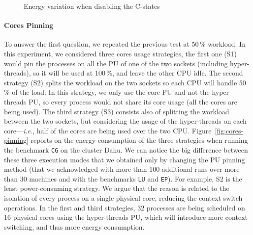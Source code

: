 \begin{figure}
    \caption{Energy variation when disabling the C-states}\label{fig:c-states}
\end{figure}

\paragraph{Cores Pinning}
To answer the first question, we repeated the previous test at 50\,\% workload.
In this experiment, we considered three cores usage strategies, the first one (\textsf{S1}) would pin the processes on all the PU of one of the two sockets (including hyper-threads), so it will be used at 100\,\%, and leave the other CPU idle.
The second strategy (\textsf{S2}) splits the workload on the two sockets so each CPU will handle 50\,\% of the load.
In this strategy, we only use the core PU and not the hyper-threads PU, so every process would not share its core usage (all the cores are being used).
The third strategy (\textsf{S3}) consists also of splitting the workload between the two sockets, but considering the usage of the hyper-threads on each core---\emph{i.e.}, half of the cores are being used over the two CPU.
Figure~\ref{fig:cores-pinning} reports on the energy consumption of the three strategies when running the benchmark \texttt{CG} on the cluster \textsf{Dahu}.
We can notice the big difference between these three execution modes that we obtained only by changing the PU pinning method (that we acknowledged with more than 100 additional runs over more than 30 machines and with the benchmarks \texttt{LU} and \texttt{EP}).
For example, \textsf{S2} is the least power-consuming strategy.
We argue that the reason is related to the isolation of every process on a single physical core, reducing the context switch operations.
In the first and third strategies, $32$ processes are being scheduled on $16$ physical cores using the hyper-threads PU, which will introduce more context switching, and thus more energy consumption.

